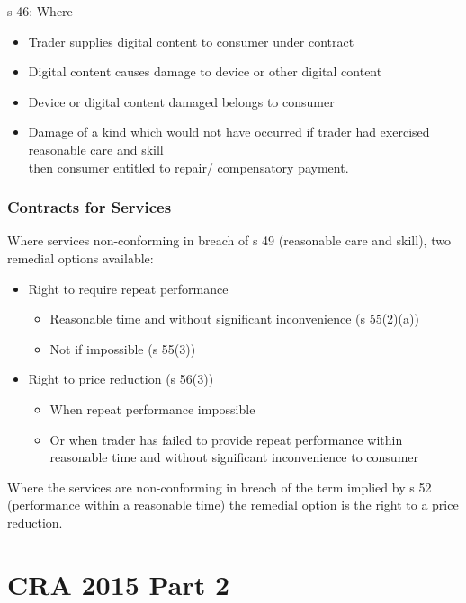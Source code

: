 \documentclass[
]{article}
\providecommand{\tightlist}{%
  \setlength{\itemsep}{0pt}\setlength{\parskip}{0pt}}
\begin{document}
s 46: Where

\begin{itemize}
\tightlist
\item
  Trader supplies digital content to consumer under contract
\item
  Digital content causes damage to device or other digital content
\item
  Device or digital content damaged belongs to consumer
\item
  Damage of a kind which would not have occurred if trader had exercised
  reasonable care and skill\\
  then consumer entitled to repair/ compensatory payment.
\end{itemize}

\hypertarget{contracts-for-services-1}{%
\subsubsection{Contracts for Services}\label{contracts-for-services-1}}

Where services non-conforming in breach of s 49 (reasonable care and
skill), two remedial options available:

\begin{itemize}
\tightlist
\item
  Right to require repeat performance

  \begin{itemize}
  \tightlist
  \item
    Reasonable time and without significant inconvenience (s 55(2)(a))
  \item
    Not if impossible (s 55(3))
  \end{itemize}
\item
  Right to price reduction (s 56(3))

  \begin{itemize}
  \tightlist
  \item
    When repeat performance impossible
  \item
    Or when trader has failed to provide repeat performance within
    reasonable time and without significant inconvenience to consumer
  \end{itemize}
\end{itemize}

Where the services are non-conforming in breach of the term implied by s
52 (performance within a reasonable time) the remedial option is the
right to a price reduction.

\hypertarget{cra-2015-part-2}{%
\section{CRA 2015 Part 2}\label{cra-2015-part-2}}
\end{document}
